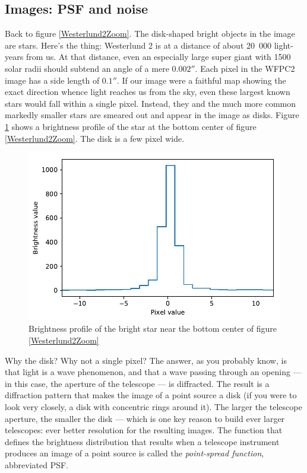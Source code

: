 \documentclass[twocolumn,apj]{openjournal}
\begin{document}
\subsection{Images: PSF and noise}

Back to figure \ref{Westerlund2Zoom}. The disk-shaped bright objects in the image are stars. Here's the thing: Westerlund 2 is at a distance of about 20~000 light-years from us. At that distance, even an especially large super giant with 1500 solar radii should subtend an angle of a mere $0.002''$. Each pixel in the WFPC2 image has a side length of $0.1''$. If our image were a faithful map showing the exact direction whence light reaches us from the sky, even these largest known stars would fall within a single pixel. Instead, they and the much more common markedly smaller stars are smeared out and appear in the image as disks. Figure \ref{Westerlund2PSF} shows a brightness profile of the star at the bottom center of figure \ref{Westerlund2Zoom}. The disk is a few pixel wide.
\begin{figure}[htbp]
\begin{center}
\includegraphics[width=\linewidth]{brightness-profile.pdf}
\caption{Brightness profile of the bright star near the bottom center of figure \ref{Westerlund2Zoom} }
\label{Westerlund2PSF}
\end{center}
\end{figure}
Why the disk? Why not a single pixel? The answer, as you probably know, is that light is a wave phenomenon, and that a wave passing through an opening --- in this case, the aperture of the telescope --- is diffracted. The result is a diffraction pattern that makes the image of a point source a disk (if you were to look very closely, a disk with concentric rings around it). The larger the telescope aperture, the smaller the disk --- which is one key reason to build ever larger telescopes: ever better resolution for the resulting images. The function that defines the brightness distribution that results when a telescope instrument produces an image of a point source is called the {\em point-spread function}, abbreviated PSF.
\end{document}
